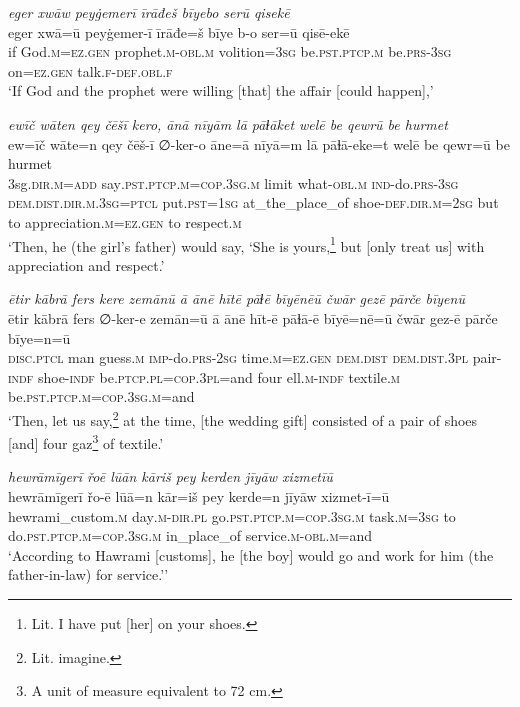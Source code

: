 \ea \label{RE.9}
\textit{eger xwāw peyġemerī īrāđeš bīyebo serū qisekē} \\ 
\gll eger xwā=ū peyġemer-ī īrāđe=š bīye b-o ser=ū qisē-ekē \\ 
 if God\textsc{.m}\textsc{\textsc{=ez.gen}} prophet\textsc{.m}\textsc{-obl}\textsc{.m} volition\textsc{=3sg} be\textsc{.pst}\textsc{.ptcp}\textsc{.m} be\textsc{.prs}\textsc{-3sg} on\textsc{\textsc{=ez.gen}} talk\textsc{.f}\textsc{-def}\textsc{.obl}\textsc{.f} \\ 
\glt `If God and the prophet were willing [that] the affair [could happen],'
\z 
 
\ea \label{RE.10}
\textit{ewīč wāten qey čēšī kero, ānā nīyām lā pāɫāket welē be qewrū be hurmet} \\ 
\gll ew=īč wāte=n qey čēš-ī ∅-ker-o āne=ā nīyā=m lā pāɫā-eke=t welē be qewr=ū be hurmet \\ 
 3sg\textsc{.dir}\textsc{.m}\textsc{=add} say\textsc{.pst}\textsc{.ptcp}\textsc{.m}\textsc{=cop}\textsc{.3sg}\textsc{.m} limit what\textsc{-obl}\textsc{.m} \textsc{ind-}do\textsc{.prs}\textsc{-3sg} \textsc{dem.dist}\textsc{.dir}\textsc{.m}\textsc{.3sg}=\textsc{ptcl} put\textsc{.pst}\textsc{=\textsc{1sg}} at\_the\_place\_of shoe\textsc{-def}\textsc{.dir}\textsc{.m}\textsc{=\textsc{2sg}} but to appreciation\textsc{.m}\textsc{\textsc{=ez.gen}} to respect\textsc{.m} \\ 
\glt `Then, he (the girl’s father) would say, ‘She is yours,\footnote{Lit. I have put [her] on your shoes.} but [only treat us] with appreciation and respect.'
\z 
 
\ea \label{RE.11}
\textit{ētir kābrā fers kere zemānū ā ānē hītē pāɫē bīyēnēū čwār gezē pārče bīyenū} \\ 
\gll ētir kābrā fers ∅-ker-e zemān=ū ā ānē hīt-ē pāɫā-ē bīyē=nē=ū čwār gez-ē pārče bīye=n=ū \\ 
 \textsc{disc.ptcl} man guess\textsc{.m} \textsc{imp-}do\textsc{.prs}-\textsc{2sg} time\textsc{.m}\textsc{=ez.gen} \textsc{dem.dist} \textsc{dem.dist}\textsc{.3pl} pair\textsc{-indf} shoe\textsc{-indf} be\textsc{.ptcp}\textsc{.pl}\textsc{=cop}\textsc{.3pl}=and four ell\textsc{.m}\textsc{-indf} textile\textsc{.m} be\textsc{.pst}\textsc{.ptcp}\textsc{.m}\textsc{=cop}\textsc{.3sg}\textsc{.m}=and \\ 
\glt `Then, let us say,\footnote{Lit. imagine.} at the time, [the wedding gift] consisted of a pair of shoes [and] four gaz\footnote{A unit of measure equivalent to 72 cm.} of textile.'
\z 
 
\ea \label{RE.12}
\textit{hewrāmīgerī řoē lūān kāriš pey kerden jīyāw xizmetīū} \\ 
\gll hewrāmīgerī řo-ē lūā=n kār=iš pey kerde=n jīyāw xizmet-ī=ū \\ 
 hewrami\_custom\textsc{.m} day\textsc{.m}\textsc{-dir}\textsc{.pl} go\textsc{.pst}\textsc{.ptcp}\textsc{.m}\textsc{=cop}\textsc{.3sg}\textsc{.m} task\textsc{.m}\textsc{=3sg} to do\textsc{.pst}\textsc{.ptcp}\textsc{.m}\textsc{=cop}\textsc{.3sg}\textsc{.m} in\_place\_of service\textsc{.m}\textsc{-obl}\textsc{.m}=and \\ 
\glt `According to Hawrami [customs], he [the boy] would go and work for him (the father-in-law) for service.’'
\z 
 
